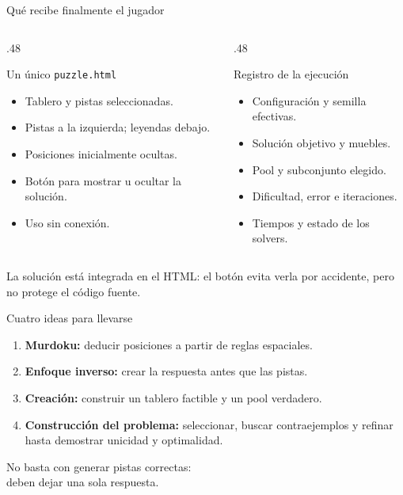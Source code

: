 \documentclass[aspectratio=169,11pt]{beamer}
\begin{document}
\begin{frame}{Qu\'e recibe finalmente el jugador}
  \begin{columns}[T,onlytextwidth]
    \begin{column}{.48\textwidth}
      \begin{block}{Un \'unico \texttt{puzzle.html}}
        \begin{itemize}
          \item Tablero y pistas seleccionadas.
          \item Pistas a la izquierda; leyendas debajo.
          \item Posiciones inicialmente ocultas.
          \item Bot\'on para mostrar u ocultar la soluci\'on.
          \item Uso sin conexi\'on.
        \end{itemize}
      \end{block}
    \end{column}
    \begin{column}{.48\textwidth}
      \begin{exampleblock}{Registro de la ejecuci\'on}
        \begin{itemize}
          \item Configuraci\'on y semilla efectivas.
          \item Soluci\'on objetivo y muebles.
          \item Pool y subconjunto elegido.
          \item Dificultad, error e iteraciones.
          \item Tiempos y estado de los solvers.
        \end{itemize}
      \end{exampleblock}
    \end{column}
  \end{columns}
  \small La soluci\'on est\'a integrada en el HTML: el bot\'on
  evita verla por accidente, pero no protege el c\'odigo fuente.
\end{frame}

\begin{frame}{Cuatro ideas para llevarse}
  \begin{enumerate}
    \setlength{\itemsep}{5mm}
    \item \textbf{Murdoku:} deducir posiciones a partir de reglas espaciales.
    \item \textbf{Enfoque inverso:} crear la respuesta antes que las pistas.
    \item \textbf{Creaci\'on:} construir un tablero factible y un pool verdadero.
    \item \textbf{Construcci\'on del problema:} seleccionar, buscar contraejemplos
      y refinar hasta demostrar unicidad y optimalidad.
  \end{enumerate}
  \vspace{4mm}
  \centering
  \large\color{teal}No basta con generar pistas correctas:\\
  deben dejar una sola respuesta.
\end{frame}
\end{document}
